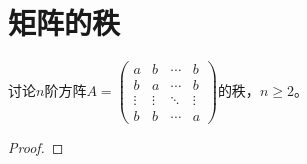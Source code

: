 \section{矩阵的秩}
\begin{theorem}
	讨论$n$阶方阵$A=
	\begin{pmatrix}
		a & b & \cdots & b \\
		b & a & \cdots & b \\
		\vdots & \vdots & \ddots & \vdots \\
		b & b & \cdots & a
	\end{pmatrix}$的秩，$n\geqslant2$。
\end{theorem}
\begin{proof}
	
\end{proof}